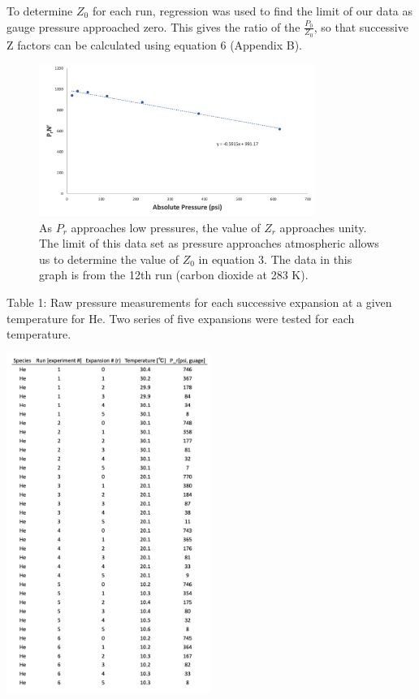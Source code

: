 \documentclass{article}
\begin{document}
\noindent To determine $Z_{0}$ for each run, regression was used to find the limit of our data as gauge pressure approached zero. This gives the ratio of the $\frac{P_{0}}{Z_{0}}$, so that successive Z factors can be calculated using equation 6 (Appendix B).

\begin{figure}[H] \centering
\includegraphics[width=0.8\textwidth]{images/NrPr.jpg}
\caption{\label{fig1}As $P_{r}$ approaches low pressures, the value of $Z_{r}$ approaches unity. The limit of this data set as pressure approaches atmospheric allows us to determine the value of $Z_{0}$ in equation 3. The data in this graph is from the 12th run (carbon dioxide at 283 K).}\end{figure}
\noindent

\newpage 
\caption{\label{fig1}Table 1: Raw pressure measurements for each successive expansion at a given temperature for He. Two series of five expansions were tested for each temperature.} 

\centering\includegraphics[width=0.5\textwidth]{images/table_0.png}\raggedright
\end{document}
